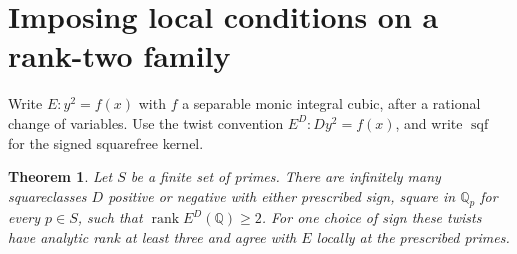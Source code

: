 \documentclass[11pt]{article}
\newtheorem{theorem}{Theorem}[section]\newtheorem{lemma}[theorem]{Lemma}
\newcommand{\Q}{\mathbb Q}\newcommand{\F}{\mathbb F}\newcommand{\Z}{\mathbb Z}
\begin{document}
\section{Imposing local conditions on a rank-two family}
Write $E:y^2=f(x)$ with $f$ a separable monic integral cubic, after a rational change of variables. Use the twist convention $E^D: D y^2=f(x)$, and write $\operatorname{sqf}$ for the signed squarefree kernel.
\begin{theorem}\label{all}
Let $S$ be a finite set of primes. There are infinitely many squareclasses $D$ positive or negative with either prescribed sign, square in $\Q_p$ for every $p\in S$, such that $\operatorname{rank}E^D(\Q)\ge2$. For one choice of sign these twists have analytic rank at least three and agree with $E$ locally at the prescribed primes.
\end{theorem}
\end{document}
